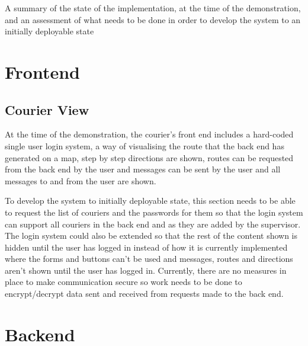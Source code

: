 A summary of the state of the implementation, at the time of the demonstration, and an assessment of what needs to be done in order to develop the system to an initially deployable state

\section{Frontend}
\subsection{Courier View}
\begin{flushleft}
At the time of the demonstration, the courier’s front end includes a hard-coded single user login system, a way of visualising the route that the back end has generated on a map, step by step directions are shown, routes can be requested from the back end by the user and messages can be sent by the user and all messages to and from the user are shown.

To develop the system to initially deployable state, this section needs to be able to request the list of couriers and the passwords for them so that the login system can support all couriers in the back end and as they are added by the supervisor. The login system could also be extended so that the rest of the content shown is hidden until the user has logged in instead of how it is currently implemented where the forms and buttons can’t be used and messages, routes and directions aren’t shown until the user has logged in. Currently, there are no measures in place to make communication secure so work needs to be done to encrypt/decrypt data sent and received from requests made to the back end.
\end{flushleft}
\section{Backend}
